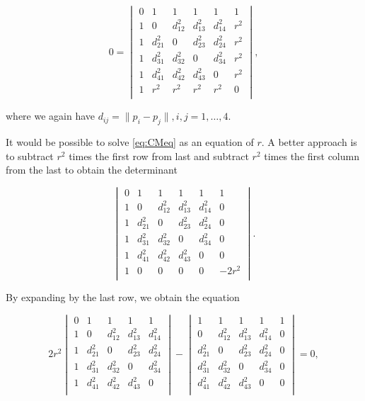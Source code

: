 \begin{equation}\label{eq:CMeq}
0 = 
\begin{vmatrix}
0 & 1 & 1 & 1 & 1 & 1 \\
1 & 0 & d^2_{12} & d^2_{13} & d^2_{14} & r^2 \\
1 & d^2_{21} & 0 & d^2_{23} & d^2_{24} & r^2 \\
1 & d^2_{31} & d^2_{32} & 0 & d^2_{34} & r^2 \\ 
1 & d^2_{41} & d^2_{42} & d^2_{43} & 0 & r^2 \\
1 & r^2 & r^2 & r^2 & r^2 & 0 \\
\end{vmatrix}, 
\end{equation}

where we again have   $d_{ij} = \|p_i - p_j\|, i,j=1,\dots,4$.\newline  

It would be possible to solve \ref{eq:CMeq} as an equation of $r$. A better approach is to  subtract $r^2$ times the first row from last and subtract $r^2$ times the first column from the last to obtain the determinant 



$$
\begin{vmatrix}
0 & 1 & 1 & 1 & 1 & 1 \\
1 & 0 & d^2_{12} & d^2_{13} & d^2_{14} & 0 \\
1 & d^2_{21} & 0 & d^2_{23} & d^2_{24} & 0 \\
1 & d^2_{31} & d^2_{32} & 0 & d^2_{34} & 0 \\ 
1 & d^2_{41} & d^2_{42} & d^2_{43} & 0 & 0 \\
1 & 0 & 0 & 0 & 0 & -2r^2 \\
\end{vmatrix}. 
$$

By expanding by the last row, we obtain the equation

$$
2r^2 \begin{vmatrix}
0 & 1 & 1 & 1 & 1 \\
1 & 0 & d^2_{12} & d^2_{13} & d^2_{14} \\
1 & d^2_{21} & 0 & d^2_{23} & d^2_{24} \\
1 & d^2_{31} & d^2_{32} & 0 & d^2_{34} \\ 
1 & d^2_{41} & d^2_{42} & d^2_{43} & 0 \\
\end{vmatrix} 
-
\begin{vmatrix}
1 & 1 & 1 & 1 & 1 \\
0 & d^2_{12} & d^2_{13} & d^2_{14} & 0 \\
d^2_{21} & 0 & d^2_{23} & d^2_{24} & 0 \\
d^2_{31} & d^2_{32} & 0 & d^2_{34} & 0 \\ 
d^2_{41} & d^2_{42} & d^2_{43} & 0 & 0 \\
\end{vmatrix} = 0,
$$

